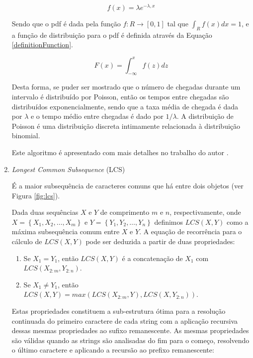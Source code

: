 \begin{enumerate}
    \begin{equation} \label{distribuicaoTempo}
        f(x) = \lambda e^{-\lambda ,x}
    \end{equation}
    
    Sendo que o pdf é dada pela função \({f \colon R \rightarrow [0,1]}\) tal que \({\int_{R}f(x)dx = 1}\), e a função de distribuição para o pdf é definida através da Equação \ref{definitionFunction}.
    
    \begin{equation} \label{definitionFunction}
        F(x) = \int_{-\infty}^{x}f(z)dz
    \end{equation}
    
    Desta forma, se puder ser mostrado que o número de chegadas durante um intervalo é distribuído por Poisson, então os tempos entre chegadas são distribuídos exponencialmente, sendo que a taxa média de chegada é dada por \({\lambda}\) e o tempo médio entre chegadas é dado por \({1/\lambda}\). A distribuição de Poisson é uma distribuição discreta intimamente relacionada à distribuição binomial.
    
    Este algoritmo é apresentado com mais detalhes no trabalho do autor \cite{winton2011}.
    
    \item \textit{Longest Common Subsequence} (LCS)
    
    É a maior subsequência de caracteres comuns que há entre dois objetos (ver Figura \ref{fig:lcs}).
    
    Dada duas sequências \({X}\) e \({Y}\) de comprimento \({m}\) e \({n}\), respectivamente, onde \({X = \left\{X_{1}, X_{2}, \ldots, X_{m} \right\} }\) e \({Y=\left\{Y_{1}, Y_{2}, \ldots, Y_{n} \right\}}\) definimos \({LCS(X,Y)}\) como a máxima subsequência comum entre \({X}\) e \({Y}\). A equação de recorrência para o cálculo de \({LCS(X,Y)}\) pode ser deduzida a partir de duas propriedades:
    
    \begin{enumerate}
        \item Se \({X_{1}=Y_{1}}\), então \({LCS(X,Y)}\) é a concatenação de \({X_{1}}\) com \({LCS(X_{2:m},Y_{2:n})}\).
        \item Se \({X_{1} \not= Y_{1}}\), então \({LCS(X,Y)=max(LCS(X_{2:m},Y), LCS(X,Y_{2:n}))}\).
    \end{enumerate}

    Estas propriedades constituem a sub-estrutura ótima para a resolução continuada do primeiro caractere de cada string com a aplicação recursiva dessas mesmas propriedades ao sufixo remanescente. As mesmas propriedades são válidas quando as strings são analisadas do fim para o começo, resolvendo o último caractere e aplicando a recursão ao prefixo remanescente:
    

\end{enumerate}
